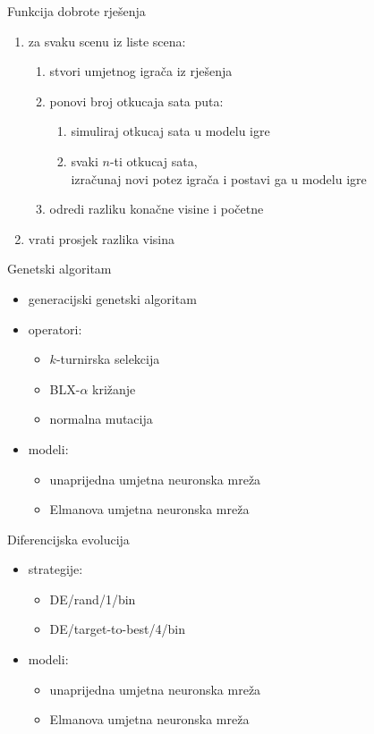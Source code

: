 \begin{frame}{Funkcija dobrote rješenja}
	\begin{enumerate}
		\item za svaku scenu iz liste scena:
		\begin{enumerate}
			\item stvori umjetnog igrača iz rješenja
			\item ponovi broj otkucaja sata puta:
			\begin{enumerate}
				\item simuliraj otkucaj sata u modelu igre
				\item svaki $n$-ti otkucaj sata, \\ izračunaj novi potez igrača i postavi ga u modelu igre
			\end{enumerate}
			\item odredi razliku konačne visine i početne
		\end{enumerate}
		\item vrati prosjek razlika visina
	\end{enumerate}
\end{frame}

\begin{frame}{Genetski algoritam}
	\begin{itemize}
		\item generacijski genetski algoritam
		\item operatori:
		\begin{itemize}
			\item $k$-turnirska selekcija
			\item BLX-$\alpha$ križanje
			\item normalna mutacija
		\end{itemize}
		\item modeli:
		\begin{itemize}
			\item unaprijedna umjetna neuronska mreža
			\item Elmanova umjetna neuronska mreža
		\end{itemize}
	\end{itemize}
\end{frame}

\begin{frame}{Diferencijska evolucija}
	\begin{itemize}
		\item strategije:
		\begin{itemize}
			\item DE/rand/1/bin
			\item DE/target-to-best/4/bin
		\end{itemize}
		\item modeli:
		\begin{itemize}
			\item unaprijedna umjetna neuronska mreža
			\item Elmanova umjetna neuronska mreža
		\end{itemize}
	\end{itemize}
\end{frame}

